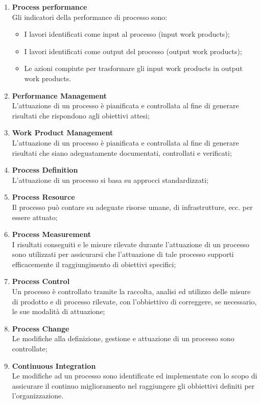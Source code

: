 \begin{enumerate}
\item \textbf{Process performance}\\
Gli indicatori della performance di processo sono:
\begin{itemize} 
\item I lavori identificati come input al processo (input work products);
\item I lavori identificati come output del processo (output work products);
\item Le azioni compiute per trasformare gli input work products in output work products.
\end{itemize}

\item \textbf{Performance Management}\\
L’attuazione di un processo è pianificata e controllata al fine di generare risultati che rispondono agli obiettivi attesi;
\item \textbf{Work Product Management}\\
L’attuazione di un processo è pianificata e controllata al fine di generare risultati che siano adeguatamente documentati, controllati e verificati;
\item \textbf{Process Definition}\\
L’attuazione di un processo si basa su approcci standardizzati;
\item \textbf{Process Resource}\\
Il processo può contare su adeguate risorse umane, di infrastrutture, ecc. per essere attuato;
\item \textbf{Process Measurement}\\
I risultati conseguiti e le misure rilevate durante l’attuazione di un processo sono utilizzati per assicurarsi che l’attuazione di tale processo supporti efficacemente il raggiungimento di obiettivi specifici;
\item \textbf{Process Control}\\
Un processo è controllato tramite la raccolta, analisi ed utilizzo delle misure di prodotto e di processo rilevate, con l’obbiettivo di correggere, se necessario, le sue modalità di attuazione;
\item \textbf{Process Change}\\
Le modifiche alla definizione, gestione e attuazione di un processo sono controllate;
\item \textbf{Continuous Integration}\\
Le modifiche ad un processo sono identificate ed implementate con lo scopo di assicurare il continuo miglioramento nel raggiungere gli obbiettivi definiti per l’organizzazione.
\end{enumerate}	

